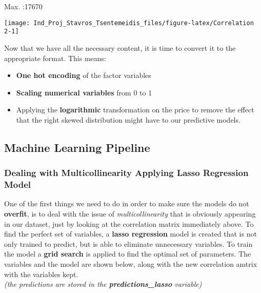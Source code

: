 \documentclass[]{article}
\providecommand{\tightlist}{%
  \setlength{\itemsep}{0pt}\setlength{\parskip}{0pt}}
\begin{document}
Max. :17670

\begin{center}\texttt{[image: Ind\_Proj\_Stavros\_Tsentemeidis\_files/figure-latex/Correlation 2-1]} \end{center}

Now that we have all the necessary content, it is time to convert it to
the appropriate format. This means:

\begin{itemize}
\tightlist
\item
  \textbf{One hot encoding} of the factor variables\\
\item
  \textbf{Scaling numerical variables} from 0 to 1\\
\item
  Applying the \textbf{logarithmic} transformation on the price to
  remove the effect that the right skewed distribution might have to our
  predictive models.
\end{itemize}

\hypertarget{machine-learning-pipeline}{%
\subsection{Machine Learning Pipeline}\label{machine-learning-pipeline}}

\hypertarget{dealing-with-multicollinearity-applying-lasso-regression-model}{%
\subsubsection{Dealing with Multicollinearity \textbar{} Applying Lasso
Regression
Model}\label{dealing-with-multicollinearity-applying-lasso-regression-model}}

One of the first things we need to do in order to make sure the models
do not \textbf{overfit}, is to deal with the issue of
\emph{multicollinearity} that is obviously appearing in our dataset,
just by looking at the correlation matrix immediately above. To find the
perfect set of variables, a \textbf{lasso regression} model is created
that is not only trained to predict, but is able to eliminate
unnecessary variables. To train the model a \textbf{grid search} is
applied to find the optimal set of parameters. The variables and the
model are shown below, along with the new correlation amtrix with the
variables kept.\\
\emph{(the predictions are stored in the \textbf{predictions\_lasso}
variable)}
\end{document}
